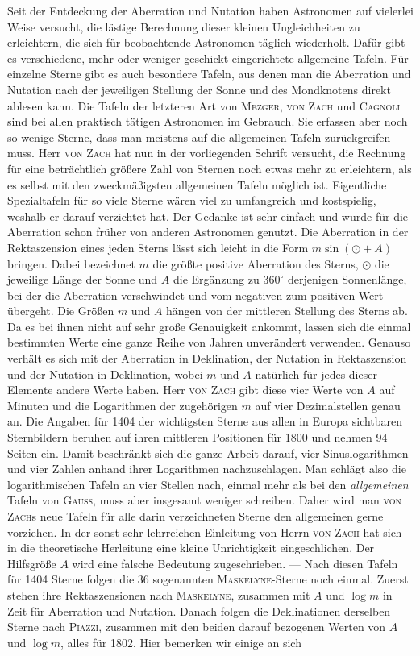 Seit der Entdeckung der Aberration und Nutation haben Astronomen auf vielerlei Weise versucht, die lästige Berechnung dieser kleinen Ungleichheiten zu erleichtern, die sich für beobachtende Astronomen täglich wiederholt. Dafür gibt es verschiedene, mehr oder weniger geschickt eingerichtete allgemeine Tafeln. Für einzelne Sterne gibt es auch besondere Tafeln, aus denen man die Aberration und Nutation nach der jeweiligen Stellung der Sonne und des Mondknotens direkt ablesen kann. Die Tafeln der letzteren Art von \textsc{Mezger}, \textsc{von Zach} und \textsc{Cagnoli} sind bei allen praktisch tätigen Astronomen im Gebrauch. Sie erfassen aber noch so wenige Sterne, dass man meistens auf die allgemeinen Tafeln zurückgreifen muss. Herr \textsc{von Zach} hat nun in der vorliegenden Schrift versucht, die Rechnung für eine beträchtlich größere Zahl von Sternen noch etwas mehr zu erleichtern, als es selbst mit den zweckmäßigsten allgemeinen Tafeln möglich ist. Eigentliche Spezialtafeln für so viele Sterne wären viel zu umfangreich und kostspielig, weshalb er darauf verzichtet hat. Der Gedanke ist sehr einfach und wurde für die Aberration schon früher von anderen Astronomen genutzt. Die Aberration in der Rektaszension eines jeden Sterns lässt sich leicht in die Form $m\sin(\odot+A)$ bringen. Dabei bezeichnet $m$ die größte positive Aberration des Sterns, $\odot$ die jeweilige Länge der Sonne und $A$ die Ergänzung zu $360^\circ$ derjenigen Sonnenlänge, bei der die Aberration verschwindet und vom negativen zum positiven Wert übergeht. Die Größen $m$ und $A$ hängen von der mittleren Stellung des Sterns ab. Da es bei ihnen nicht auf sehr große Genauigkeit ankommt, lassen sich die einmal bestimmten Werte eine ganze Reihe von Jahren unverändert verwenden. Genauso verhält es sich mit der Aberration in Deklination, der Nutation in Rektaszension und der Nutation in Deklination, wobei $m$ und $A$ natürlich für jedes dieser Elemente andere Werte haben. Herr \textsc{von Zach} gibt diese vier Werte von $A$ auf Minuten und die Logarithmen der zugehörigen $m$ auf vier Dezimalstellen genau an. Die Angaben für 1404 der wichtigsten Sterne aus allen in Europa sichtbaren Sternbildern beruhen auf ihren mittleren Positionen für 1800 und nehmen 94 Seiten ein. Damit beschränkt sich die ganze Arbeit darauf, vier Sinuslogarithmen und vier Zahlen anhand ihrer Logarithmen nachzuschlagen. Man schlägt also die logarithmischen Tafeln an vier Stellen nach, einmal mehr als bei den \emph{allgemeinen} Tafeln von \textsc{Gauss}, muss aber insgesamt weniger schreiben. Daher wird man \textsc{von Zach}s neue Tafeln für alle darin verzeichneten Sterne den allgemeinen gerne vorziehen. In der sonst sehr lehrreichen Einleitung von Herrn \textsc{von Zach} hat sich in die theoretische Herleitung eine kleine Unrichtigkeit eingeschlichen. Der Hilfsgröße $A$ wird eine falsche Bedeutung zugeschrieben. --- Nach diesen Tafeln für 1404 Sterne folgen die 36 sogenannten \textsc{Maskelyne}-Sterne noch einmal. Zuerst stehen ihre Rektaszensionen nach \textsc{Maskelyne}, zusammen mit $A$ und $\log m$ in Zeit für Aberration und Nutation. Danach folgen die Deklinationen derselben Sterne nach \textsc{Piazzi}, zusammen mit den beiden darauf bezogenen Werten von $A$ und $\log m$, alles für 1802. Hier bemerken wir einige an sich 